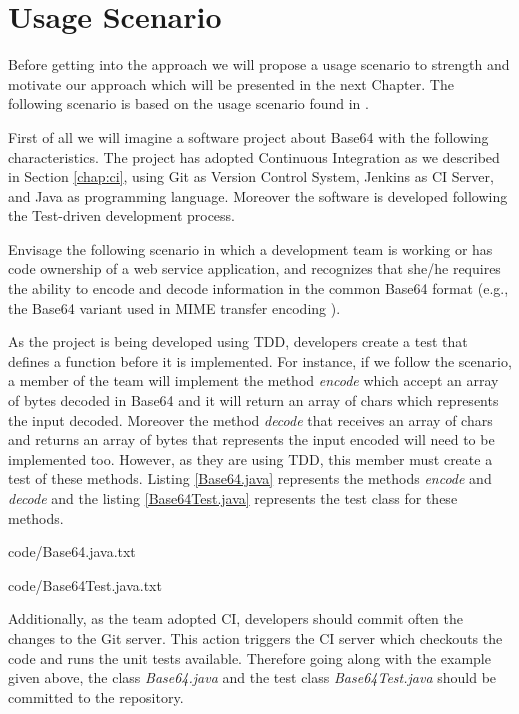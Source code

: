\chapter{Usage Scenario}
\label{usage-scenario}
Before getting into the approach we will propose a usage scenario to strength and motivate our approach which will be presented in the next Chapter. The following scenario is based on the usage scenario found in \cite{Kessel2016}.

First of all we will imagine a software project about Base64 with the following characteristics. The project has adopted Continuous Integration as we described in Section \ref{chap:ci}, using Git as Version Control System, Jenkins as CI Server, and Java as programming language. Moreover the software is developed following the Test-driven development process.

Envisage the following scenario in which a development team is working or has code ownership of a web service application, and recognizes that she/he requires the ability to encode and decode information in the common Base64 format (e.g., the Base64 variant used in MIME transfer encoding \cite{rfc2045}).

As the project is being developed using TDD, developers create a test that defines a function before it is implemented. For instance, if we follow the scenario, a member of the team will implement the method \emph{encode} which accept an array of bytes decoded in Base64 and it will return an array of chars which represents the input decoded. Moreover the method \emph{decode} that receives an array of chars and returns an array of bytes that represents the input encoded will need to be implemented too. However, as they are using TDD, this member must create a test of these methods. Listing \ref{Base64.java} represents the methods \emph{encode} and \emph{decode} and the listing \ref{Base64Test.java} represents the test class for these methods.


{code/Base64.java.txt}


{code/Base64Test.java.txt}

Additionally, as the team adopted CI, developers should commit often the changes to the Git server. This action triggers the CI server which checkouts the code and runs the unit tests available. Therefore going along with the example given above, the class \emph{Base64.java} and the test class \emph{Base64Test.java} should be committed to the repository.

